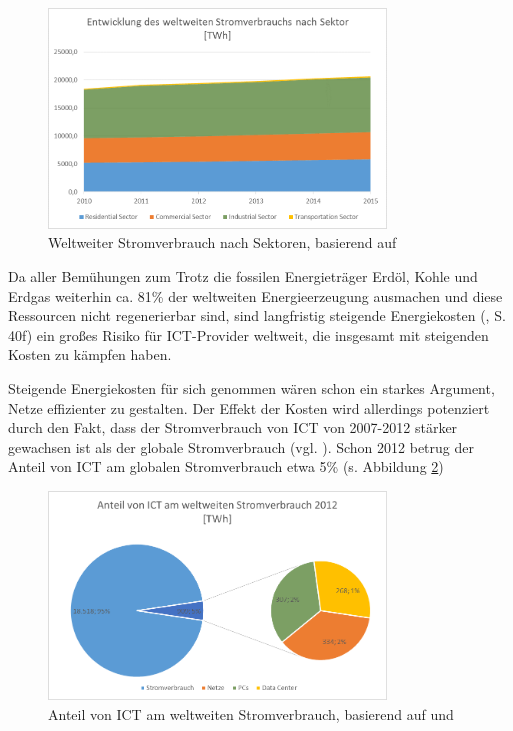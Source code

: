 \documentclass[12pt,titlepage]{article}
\begin{document}
\begin{figure}[!ht]
	\centering
	\includegraphics[width=0.8\textwidth]{ProbStromSektor}
	\caption{Weltweiter Stromverbrauch nach Sektoren, basierend auf \cite{bibid}}
	\label{fig:ProbStromSektor}
\end{figure}
Da aller Bemühungen zum Trotz die fossilen Energieträger Erdöl, Kohle und Erdgas weiterhin ca. 81\% der weltweiten Energieerzeugung ausmachen \cite{statista} und diese Ressourcen nicht regenerierbar sind, sind langfristig steigende Energiekosten (\cite{iea2015}, S. 40f) ein großes Risiko für ICT-Provider weltweit, die insgesamt mit steigenden Kosten zu kämpfen haben.

Steigende Energiekosten für sich genommen wären schon ein starkes Argument, Netze effizienter zu gestalten.  Der Effekt der Kosten wird allerdings potenziert durch den Fakt, dass der Stromverbrauch von ICT von 2007-2012 stärker gewachsen ist als der globale Stromverbrauch (vgl. \cite[9]{vanhedde}). Schon 2012 betrug der Anteil von ICT am globalen Stromverbrauch etwa 5\% (s. Abbildung \ref{fig:ProbStromICT})

\begin{figure}[!ht]
	\centering
	\includegraphics[width=0.8\textwidth]{ProbStromICT}
	\caption{Anteil von ICT am weltweiten Stromverbrauch, basierend auf \cite{bibid} und \cite{bibid}}
	\label{fig:ProbStromICT}
\end{figure}
\end{document}
